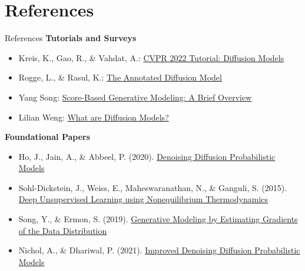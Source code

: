 \section{References}
\begin{frame}[allowframebreaks]{References}
\textbf{Tutorials and Surveys}
\begin{itemize}
    \item Kreis, K., Gao, R., \& Vahdat, A.: \href{https://cvpr2022-tutorial-diffusion-models.github.io/}{CVPR 2022 Tutorial: Diffusion Models}
    \item Rogge, L., \& Rasul, K.: \href{https://huggingface.co/blog/annotated-diffusion}{The Annotated Diffusion Model}
    \item Yang Song: \href{https://yang-song.github.io/blog/2021/score/}{Score-Based Generative Modeling: A Brief Overview}
    \item Lilian Weng: \href{https://lilianweng.github.io/posts/2021-07-11-diffusion-models/}{What are Diffusion Models?}
\end{itemize}

\framebreak

\textbf{Foundational Papers}
\begin{itemize}
    \item Ho, J., Jain, A., \& Abbeel, P. (2020). \href{https://arxiv.org/abs/2006.11239}{Denoising Diffusion Probabilistic Models}
    \item Sohl-Dickstein, J., Weiss, E., Maheswaranathan, N., \& Ganguli, S. (2015). \href{https://arxiv.org/abs/1503.03585}{Deep Unsupervised Learning using Nonequilibrium Thermodynamics}
    \item Song, Y., \& Ermon, S. (2019). \href{https://arxiv.org/abs/1907.05600}{Generative Modeling by Estimating Gradients of the Data Distribution}
    \item Nichol, A., \& Dhariwal, P. (2021). \href{https://arxiv.org/abs/2102.09672}{Improved Denoising Diffusion Probabilistic Models}
\end{itemize}

\framebreak


\end{frame}
